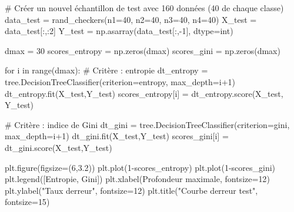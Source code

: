 \documentclass[
  letterpaper,
  DIV=11,
  numbers=noendperiod]{scrartcl}
\newenvironment{Shaded}{\begin{snugshade}}{\end{snugshade}}
\newcommand{\BuiltInTok}[1]{\textcolor[rgb]{0.00,0.23,0.31}{#1}}
\newcommand{\CommentTok}[1]{\textcolor[rgb]{0.37,0.37,0.37}{#1}}
\newcommand{\ControlFlowTok}[1]{\textcolor[rgb]{0.00,0.23,0.31}{#1}}
\newcommand{\DecValTok}[1]{\textcolor[rgb]{0.68,0.00,0.00}{#1}}
\newcommand{\FloatTok}[1]{\textcolor[rgb]{0.68,0.00,0.00}{#1}}
\newcommand{\KeywordTok}[1]{\textcolor[rgb]{0.00,0.23,0.31}{#1}}
\newcommand{\NormalTok}[1]{\textcolor[rgb]{0.00,0.23,0.31}{#1}}
\newcommand{\OperatorTok}[1]{\textcolor[rgb]{0.37,0.37,0.37}{#1}}
\newcommand{\StringTok}[1]{\textcolor[rgb]{0.13,0.47,0.30}{#1}}
\begin{document}
\begin{Shaded}
\begin{Highlighting}[]
\CommentTok{\# Créer un nouvel échantillon de test avec 160 données (40 de chaque classe)}
\NormalTok{data\_test }\OperatorTok{=}\NormalTok{ rand\_checkers(n1}\OperatorTok{=}\DecValTok{40}\NormalTok{, n2}\OperatorTok{=}\DecValTok{40}\NormalTok{, n3}\OperatorTok{=}\DecValTok{40}\NormalTok{, n4}\OperatorTok{=}\DecValTok{40}\NormalTok{)}
\NormalTok{X\_test }\OperatorTok{=}\NormalTok{ data\_test[:,:}\DecValTok{2}\NormalTok{]}
\NormalTok{Y\_test }\OperatorTok{=}\NormalTok{ np.asarray(data\_test[:,}\OperatorTok{{-}}\DecValTok{1}\NormalTok{], dtype}\OperatorTok{=}\BuiltInTok{int}\NormalTok{)}

\NormalTok{dmax }\OperatorTok{=} \DecValTok{30}                             
\NormalTok{scores\_entropy }\OperatorTok{=}\NormalTok{ np.zeros(dmax)}
\NormalTok{scores\_gini }\OperatorTok{=}\NormalTok{ np.zeros(dmax)}


\ControlFlowTok{for}\NormalTok{ i }\KeywordTok{in} \BuiltInTok{range}\NormalTok{(dmax):}
    \CommentTok{\# Critère : entropie}
\NormalTok{    dt\_entropy }\OperatorTok{=}\NormalTok{ tree.DecisionTreeClassifier(criterion}\OperatorTok{=}\StringTok{\textquotesingle{}entropy\textquotesingle{}}\NormalTok{, }
\NormalTok{                                             max\_depth}\OperatorTok{=}\NormalTok{i}\OperatorTok{+}\DecValTok{1}\NormalTok{)}
\NormalTok{    dt\_entropy.fit(X\_test,Y\_test)}
\NormalTok{    scores\_entropy[i] }\OperatorTok{=}\NormalTok{ dt\_entropy.score(X\_test, Y\_test)}

    \CommentTok{\# Critère : indice de Gini}
\NormalTok{    dt\_gini }\OperatorTok{=}\NormalTok{ tree.DecisionTreeClassifier(criterion}\OperatorTok{=}\StringTok{\textquotesingle{}gini\textquotesingle{}}\NormalTok{, }
\NormalTok{                                          max\_depth}\OperatorTok{=}\NormalTok{i}\OperatorTok{+}\DecValTok{1}\NormalTok{)}
\NormalTok{    dt\_gini.fit(X\_test,Y\_test)}
\NormalTok{    scores\_gini[i] }\OperatorTok{=}\NormalTok{ dt\_gini.score(X\_test,Y\_test)}

\NormalTok{plt.figure(figsize}\OperatorTok{=}\NormalTok{(}\DecValTok{6}\NormalTok{,}\FloatTok{3.2}\NormalTok{))}
\NormalTok{plt.plot(}\DecValTok{1}\OperatorTok{{-}}\NormalTok{scores\_entropy)}
\NormalTok{plt.plot(}\DecValTok{1}\OperatorTok{{-}}\NormalTok{scores\_gini)}
\NormalTok{plt.legend([}\StringTok{\textquotesingle{}Entropie\textquotesingle{}}\NormalTok{, }\StringTok{\textquotesingle{}Gini\textquotesingle{}}\NormalTok{])}
\NormalTok{plt.xlabel(}\StringTok{\textquotesingle{}Profondeur maximale\textquotesingle{}}\NormalTok{, fontsize}\OperatorTok{=}\DecValTok{12}\NormalTok{)}
\NormalTok{plt.ylabel(}\StringTok{"Taux d\textquotesingle{}erreur"}\NormalTok{, fontsize}\OperatorTok{=}\DecValTok{12}\NormalTok{)}
\NormalTok{plt.title(}\StringTok{"Courbe d\textquotesingle{}erreur test"}\NormalTok{, fontsize}\OperatorTok{=}\DecValTok{15}\NormalTok{)}
\end{Highlighting}
\end{Shaded}
\end{document}
